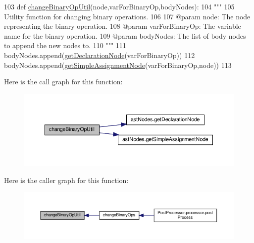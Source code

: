 \begin{DoxyCode}
103 \textcolor{keyword}{def }\hyperlink{namespacePostProcessor_1_1utils_ab12ae71cedd8ec3fcbfedd7a6dbe6599}{changeBinaryOpUtil}(node,varForBinaryOp,bodyNodes):
104     \textcolor{stringliteral}{"""
}
105 \textcolor{stringliteral}{    Utility function for changing binary operations.
}
106 \textcolor{stringliteral}{
}
107 \textcolor{stringliteral}{    @param node: The node representing the binary operation.
}
108 \textcolor{stringliteral}{    @param varForBinaryOp: The variable name for the binary operation.
}
109 \textcolor{stringliteral}{    @param bodyNodes: The list of body nodes to append the new nodes to.
}
110 \textcolor{stringliteral}{    """}
111     bodyNodes.append(\hyperlink{namespaceastNodes_ae5e5c7f09a1586002b20db6d72f6d30b}{getDeclarationNode}(varForBinaryOp))
112     bodyNodes.append(\hyperlink{namespaceastNodes_a2403f5d006e54f20e614226280cb6cbc}{getSimpleAssignmentNode}(varForBinaryOp,node))
113 
\end{DoxyCode}
Here is the call graph for this function\+:\nopagebreak
\begin{figure}[H]
\begin{center}
\leavevmode
\includegraphics[width=350pt]{namespacePostProcessor_1_1utils_ab12ae71cedd8ec3fcbfedd7a6dbe6599_cgraph}
\end{center}
\end{figure}
Here is the caller graph for this function\+:\nopagebreak
\begin{figure}[H]
\begin{center}
\leavevmode
\includegraphics[width=350pt]{namespacePostProcessor_1_1utils_ab12ae71cedd8ec3fcbfedd7a6dbe6599_icgraph}
\end{center}
\end{figure}
\mbox{\label{namespacePostProcessor_1_1utils_a756305ef1f9ed9b8a0f01428433e026e}} 
